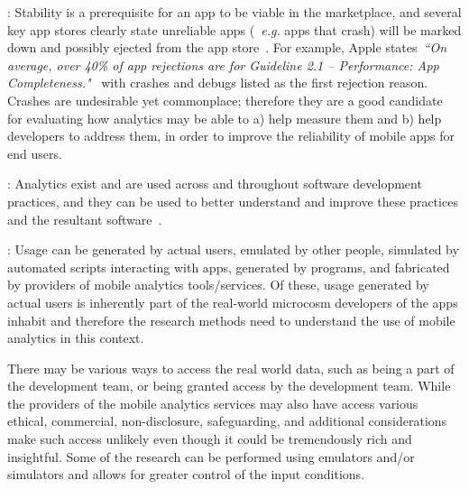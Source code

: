 : Stability is a prerequisite for an app to be viable in the marketplace, and several key app stores clearly state unreliable apps (~\emph{e.g.} apps that crash) will be marked down and possibly ejected from the app store~. For example, Apple states~\emph{``On average, over 40\% of app rejections are for Guideline 2.1 – Performance: App Completeness."}~ with crashes and debugs listed as the first rejection reason. %
Crashes are undesirable yet commonplace; therefore they are a good candidate for evaluating how analytics may be able to a) help measure them and b) help developers to address them, in order to improve the reliability of mobile apps for end users.


: Analytics exist and are used across and throughout software development practices, and they can be used to better understand and improve these practices and the resultant software~.

:
Usage can be generated by actual users, emulated by other people, simulated by automated scripts interacting with apps, generated by programs, and fabricated by providers of mobile analytics tools/services. Of these, usage generated by actual users is inherently part of the real-world microcosm developers of the apps inhabit and therefore the research methods need to understand the use of mobile analytics in this context. 

There may be various ways to access the real world data, such as being a part of the development team, or being granted access by the development team. While the providers of the mobile analytics services may also have access various ethical, commercial, non-disclosure, safeguarding, and additional considerations make such access unlikely even though it could be tremendously rich and insightful. Some of the research can be performed using emulators and/or simulators and allows for greater control of the input conditions.


